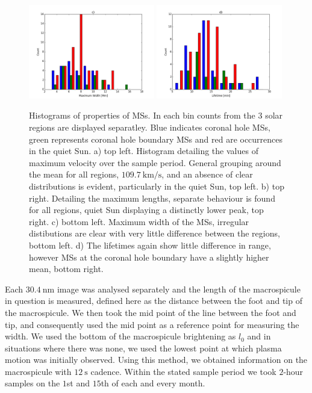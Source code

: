 \begin{figure}[t!]
	\includegraphics[width=0.49\textwidth, height=0.24\textheight]{Chapter3/Figs/width_hist.pdf}
	\includegraphics[width=0.49\textwidth, height=0.24\textheight]{Chapter3/Figs/lt_hist.pdf}	
	\caption{\small Histograms of properties of MSs. In each bin counts from the 3 solar regions are displayed separatley. Blue indicates coronal hole MSs, green represents coronal hole boundary MSs and red are occurrences in the quiet Sun. a) top left. Histogram detailing the values of maximum velocity over the sample period. General grouping around the mean for all regions, $109.7\ \textrm{km/s}$, and an absence of clear distributions is evident, particularly in the quiet Sun, top left. b) top right. Detailing the maximum lengths, separate behaviour is found for all regions, quiet Sun displaying a distinctly lower peak, top right. c) bottom left. Maximum width of the MSs, irregular distibutions are clear with very little difference between the regions, bottom left. d) The lifetimes again show little difference in range, however MSs at the coronal hole boundary have a slightly higher mean, bottom right.}
	\label{fig:basic-prop}
\end{figure}


Each $30.4\ \textrm{nm}$ image was analysed separately and the length of the macrospicule in question is measured, defined here as the distance between the foot and tip of the macrospicule. We then took the mid point of the line between the foot and tip, and consequently used the mid point as a reference point for measuring the width. We used the bottom of the macrospicule brightening as $l_0$ and in situations where there was none, we used the lowest point at which plasma motion was initially observed. Using this method, we obtained information on the macrospicule with $12\ \textrm{s}$ cadence. Within the stated sample period we took $2$-hour samples on the $1$st and $15$th of each and every month.

